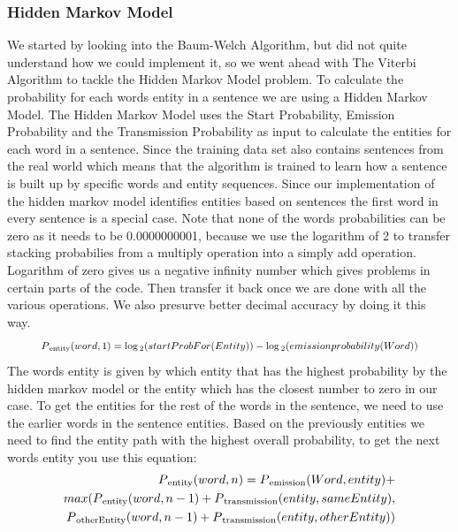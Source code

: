 \documentclass{article}
\begin{document}
\subsubsection{Hidden Markov Model}
We started by looking into the Baum-Welch Algorithm, but did not quite understand how we could implement it, so we went ahead with The Viterbi Algorithm to tackle the Hidden Markov Model problem.
To calculate the probability for each words entity in a sentence we are using a Hidden Markov Model. The Hidden Markov Model uses the Start Probability, Emission Probability and the Transmission Probability as input to calculate the entities for each word in a sentence. Since the training data set also contains sentences from the real world which means that the algorithm is trained to learn how a sentence is built up by specific words and entity sequences.
Since our implementation of the hidden markov model identifies entities based on sentences the first word in every sentence is a special case. Note that none of the words probabilities can be zero as it needs to be 0.0000000001, because we use the logarithm of 2 to transfer stacking probabilies from a multiply operation into a simply add operation. Logarithm of zero gives us a negative infinity number which gives problems in certain parts of the code. Then transfer it back once we are done with all the various operations. We also presurve better decimal accuracy by doing it this way.
\begin{equation}
\resizebox{0.9\textwidth}{!}{
$
P\textsubscript{entity}(word,1) = \log\textsubscript{2}(startProbFor(Entity)) - \log\textsubscript{2}(emissionprobability(Word))
$
}
\end{equation}
The words entity is given by which entity that has the highest probability by the hidden markov model or the entity which has the closest number to zero in our case. To get the entities for the rest of the words in the sentence, we need to use the earlier words in the sentence entities. Based on the previously entities we need to find the entity path with the highest overall probability, to get the next words entity you use this equation:
\begin{equation}
\begin{split}
P\textsubscript{entity}(word,n)=P\textsubscript{emission}(Word,entity)+\\max(P\textsubscript{entity}(word,n-1)+P\textsubscript{transmission}(entity,sameEntity),\\P\textsubscript{otherEntity}(word,n-1)+P\textsubscript{transmission}(entity,otherEntity))
\end{split}
\end{equation}
\end{document}
